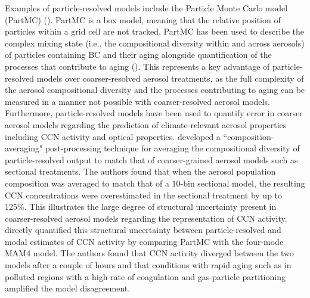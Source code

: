 Examples of particle-resolved models include the Particle Monte Carlo model (PartMC) (\cite{riemer_simulating_2009}). PartMC is a box model, meaning that the relative position of particles within a grid cell are not tracked. PartMC has been used to describe the complex mixing state (i.e., the compositional diversity within and across aerosols) of particles containing BC and their aging alongside quantification of the processes that contribute to aging (\cite{riemer_simulating_2009}). This represents a key advantage of particle-resolved models over coarser-resolved aerosol treatments, as the full complexity of the aerosol compositional diversity and the processes contributing to aging can be measured in a manner not possible with coarser-resolved aerosol models. Furthermore, particle-resolved models have been used to quantify error in coarser aerosol models regarding the prediction of climate-relevant aerosol properties including CCN activity and optical properties. \cite{zaveri_particle-resolved_2010} developed a ``composition-averaging" post-processing technique for averaging the compositional diversity of particle-resolved output to match that of coarser-grained aerosol models such as sectional treatments. The authors found that when the aerosol population composition was averaged to match that of a 10-bin sectional model, the resulting CCN concentrations were overestimated in the sectional treatment by up to 125\%. This illustrates the large degree of structural uncertainty present in coarser-resolved aerosol models regarding the representation of CCN activity. \cite{fierce_quantifying_2024} directly quantified this structural uncertainty between particle-resolved and modal estimates of CCN activity by comparing PartMC with the four-mode MAM4 model. The authors found that CCN activity diverged between the two models after a couple of hours and that conditions with rapid aging such as in polluted regions with a high rate of coagulation and gas-particle partitioning amplified the model disagreement. 

